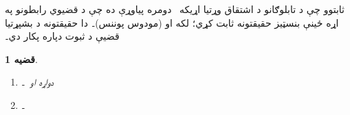 \documentclass[12pt,a4paper,oneside]{report}
\newcommand{\olfileid}[3]{\gdef\pspart{#1}\gdef\pschapter{#2}\gdef\pssection{#3}}
\gdef\pspart{#2}\gdef\pschapter{#3}\gdef\pssection{}%
\newcommand{\ollabel}[1]{\label{\pspart:\pschapter:\pssection:#1}}
\newtheorem{prop}[thm]{قضيه}
\theoremstyle{definition}
\newenvironment{explain}{}{}
\begin{document}
\label{olpseg:OLP-0107-B005:start}
\olfileid{fol}{tab}{ppr}
\label{olpseg:OLP-0107-B005:end}

\label{olpseg:OLP-0107-B006:start}
\label{olpseg:OLP-0107-B006:end}

\label{olpseg:OLP-0107-B007:start}
\begin{explain}
  ثابتوو چې د تابلوګانو د اشتقاق وړتيا اړيکه~\LR{$\Proves$} دومره
  پياوړې ده چې د قضيوي رابطونو په اړه ځينې بنسټيز حقيقتونه ثابت
  کړي؛ لکه  او
   (مودوس پوننس)۔ دا حقيقتونه د
  بشپړتيا قضیې د ثبوت دپاره پکار دي۔
\end{explain}
\label{olpseg:OLP-0107-B007:end}

\label{olpseg:OLP-0107-B008:start}
\begin{prop}\ollabel{prop:provability-land}
  \begin{enumerate}
  \item \ollabel{prop:provability-land-left} دواړه
     او~۔
  \item \ollabel{prop:provability-land-right}
    ۔
  \end{enumerate}
\end{prop}
\label{olpseg:OLP-0107-B008:end}
\end{document}
